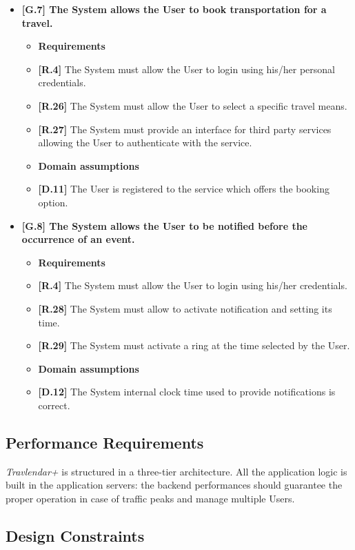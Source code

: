 \begin{itemize}
	\item \textbf{[G.7] The System allows the User to book transportation for a travel.}
	\begin{itemize}
		\item [] \textbf{Requirements}
		\item \textbf{[R.4]} The System must allow the User to login using his/her personal credentials.
		\item \textbf{[R.26]} The System must allow the User to select a specific travel means.
		\item \textbf{[R.27]} The System must provide an interface for third party services allowing the User to authenticate with the service.
		\item [] \textbf{Domain assumptions}
		\item \textbf{[D.11]} The User is registered to the service which offers the booking option.
	\end{itemize}

	\item \textbf{[G.8] The System allows the User to be notified before the occurrence of an event.}
	\begin{itemize}
		\item [] \textbf{Requirements}
		\item \textbf{[R.4]} The System must allow the User to login using his/her credentials.
		\item \textbf{[R.28]} The System must allow to activate notification and setting its time.
		\item \textbf{[R.29]} The System must activate a ring at the time selected by the User.
		\item [] \textbf{Domain assumptions}
		\item \textbf{[D.12]} The System internal clock time used to provide notifications is correct.
	\end{itemize}
\end{itemize}

\subsection{Performance Requirements}
\textit{Travlendar+} is structured in a three-tier architecture. All the application logic is built in the application servers: the backend performances should guarantee the proper operation in case of traffic peaks and manage multiple Users.

\subsection{Design Constraints}

